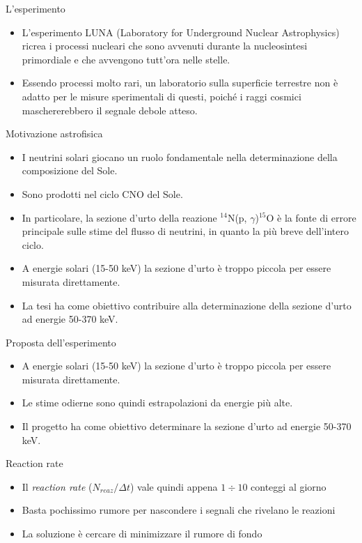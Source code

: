 \documentclass [xcolor=svgnames, 9pt] {beamer}
\begin{document}
\begin{frame}[noframenumbering]{L'esperimento}
	\begin{itemize}
		\item<1-> L'esperimento LUNA (Laboratory for Underground Nuclear Astrophysics) ricrea i processi nucleari che sono avvenuti durante la nucleosintesi primordiale e che avvengono tutt'ora nelle stelle.
		\item<2-> Essendo processi molto rari, un laboratorio sulla superficie terrestre non è adatto per le misure sperimentali di questi, poiché i raggi cosmici maschererebbero il segnale debole atteso.
	\end{itemize}
\end{frame}


\begin{frame}[noframenumbering]{Motivazione astrofisica}
	\begin{itemize}
		\item<1-> I neutrini solari giocano un ruolo fondamentale nella determinazione della composizione del Sole.
		\item<2-> Sono prodotti nel ciclo CNO del Sole.
		\item<3-> In particolare, la sezione d'urto della reazione $^{14}$N(p, $\gamma$)$^{15}$O è la fonte di errore principale sulle stime del flusso di neutrini, in quanto la più breve dell'intero ciclo.
		\item<4-> A energie solari (15-50 keV) la sezione d'urto è troppo piccola per essere misurata direttamente.
		\item<5-> La tesi ha come obiettivo contribuire alla determinazione della sezione d'urto ad energie 50-370 keV.
	\end{itemize}
\end{frame}
\begin{frame}[noframenumbering]{Proposta dell'esperimento}
	\begin{itemize}
		\item<1-> A energie solari (15-50 keV) la sezione d'urto è troppo piccola per essere misurata direttamente.
		\item<2-> Le stime odierne sono quindi estrapolazioni da energie più alte.
		\item<3-> Il progetto ha come obiettivo determinare la sezione d'urto ad energie 50-370 keV.
	\end{itemize}
\end{frame}

\begin{frame}[noframenumbering]{Reaction rate}
	\begin{itemize}
			\item<1-> Il \emph{reaction rate} ($N_{reaz}/\Delta t$) vale quindi appena $1\div 10$ conteggi al giorno
			\item<2-> Basta pochissimo rumore per nascondere i segnali che rivelano le reazioni
			\item<3-> La soluzione è cercare di minimizzare il rumore di fondo 
		\end{itemize}
\end{frame}
\end{document}
